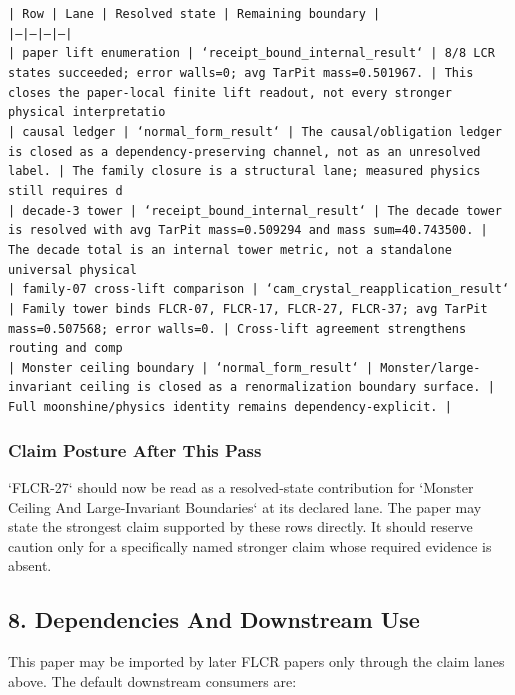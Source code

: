 \documentclass[11pt]{article}
\begin{document}
\noindent\texttt{| Row | Lane | Resolved state | Remaining boundary |}\\
\noindent\texttt{|---|---|---|---|}\\
\noindent\texttt{| paper lift enumeration | `receipt\_bound\_internal\_result` | 8/8 LCR states succeeded; error walls=0; avg TarPit mass=0.501967. | This closes the paper-local finite lift readout, not every stronger physical interpretatio}\\
\noindent\texttt{| causal ledger | `normal\_form\_result` | The causal/obligation ledger is closed as a dependency-preserving channel, not as an unresolved label. | The family closure is a structural lane; measured physics still requires d}\\
\noindent\texttt{| decade-3 tower | `receipt\_bound\_internal\_result` | The decade tower is resolved with avg TarPit mass=0.509294 and mass sum=40.743500. | The decade total is an internal tower metric, not a standalone universal physical }\\
\noindent\texttt{| family-07 cross-lift comparison | `cam\_crystal\_reapplication\_result` | Family tower binds FLCR-07, FLCR-17, FLCR-27, FLCR-37; avg TarPit mass=0.507568; error walls=0. | Cross-lift agreement strengthens routing and comp}\\
\noindent\texttt{| Monster ceiling boundary | `normal\_form\_result` | Monster/large-invariant ceiling is closed as a renormalization boundary surface. | Full moonshine/physics identity remains dependency-explicit. |}\\

\subsubsection*{Claim Posture After This Pass}

`FLCR-27` should now be read as a resolved-state contribution for `Monster Ceiling And Large-Invariant Boundaries` at its declared lane. The paper may state the strongest claim supported by these rows directly. It should reserve caution only for a specifically named stronger claim whose required evidence is absent.

\subsection*{8. Dependencies And Downstream Use}

This paper may be imported by later FLCR papers only through the claim lanes
above. The default downstream consumers are:
\end{document}
